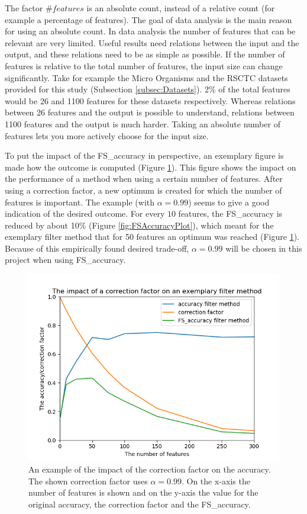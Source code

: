 \documentclass[10pt,a4paper]{article}
\begin{document}
	The factor $\#features$ is an absolute count, instead of a relative count (for example a percentage of features). The goal of data analysis is the main reason for using an absolute count. In data analysis the number of features that can be relevant are very limited. Useful results need relations between the input and the output, and these relations need to be as simple as possible. If the number of features is relative to the total number of features, the input size can change significantly. Take for example the Micro Organisms and the RSCTC datasets provided for this study (Subsection \ref{subsec:Datasets}). 2\% of the total features would be 26 and 1100 features for these datasets respectively. Whereas relations between 26 features and the output is possible to understand, relations between 1100 features and the output is much harder. Taking an absolute number of features lets you more actively choose for the input size.
	
	To put the impact of the FS\_accuracy in perspective, an exemplary figure is made how the outcome is computed (Figure \ref{fig:FSAccuracyExample}). This figure shows the impact on the performance of a method when using a certain number of features. After using a correction factor, a new optimum is created for which the number of features is important. The example (with $\alpha = 0.99$) seems to give a good indication of the desired outcome. For every $10$ features, the FS\_accuracy is reduced by about 10\% (Figure \ref{fig:FSAccuracyPlot}), which meant for the exemplary filter method that for 50 features an optimum was reached (Figure \ref{fig:FSAccuracyExample}). Because of this empirically found desired trade-off, $\alpha = 0.99$ will be chosen in this project when using FS\_accuracy. 
	
	\begin{figure}[H]
		\includegraphics[]{FS_accuracy_example.png}
		\caption{An example of the impact of the correction factor on the accuracy. The shown correction factor uses $\alpha = 0.99$. On the x-axis the number of features is shown and on the y-axis the value for the original accuracy, the correction factor and the FS\_accuracy.}
		\label{fig:FSAccuracyExample}
	\end{figure}
	
\end{document}
